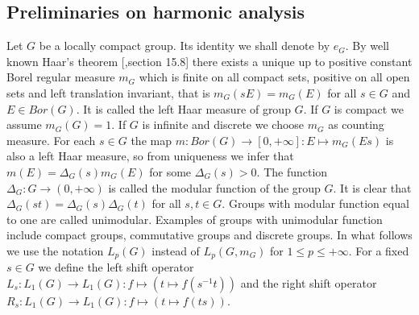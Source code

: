
\subsection{
    Preliminaries on harmonic analysis
}\label{SectionPreliminariesOnHarmonicAnalysis} 

Let $G$ be a locally compact group. Its identity we shall denote by $e_G$. By
well known Haar's theorem [\cite{HewRossAbstrHarmAnalVol1},section 15.8] there
exists a unique up to positive constant Borel regular measure $m_G$ which is
finite on all compact sets, positive on all open sets and left translation
invariant, that is $m_G(sE)=m_G(E)$ for all $s\in G$ and $E\in Bor(G)$. It is
called the left Haar measure of group $G$. If $G$ is compact we assume
$m_G(G)=1$. If $G$ is infinite and discrete we choose $m_G$ as counting measure.
For each $s\in G$ the map $m:Bor(G)\to[0,+\infty]:E\mapsto m_G(Es)$ is also a
left Haar measure, so from uniqueness we infer that $m(E)=\Delta_G(s)m_G(E)$ for
some $\Delta_G(s)>0$. The function $\Delta_G:G\to(0,+\infty)$ is called the
modular function of the group $G$. It is clear that
$\Delta_G(st)=\Delta_G(s)\Delta_G(t)$ for all $s,t\in G$. Groups with modular
function equal to one are called unimodular. Examples of groups with unimodular
function include compact groups, commutative groups and discrete groups. In what
follows we use the notation $L_p(G)$ instead of $L_p(G,m_G)$ 
for $1\leq p\leq+\infty$. For a fixed $s\in G$ we define the left shift operator
$L_s:L_1(G)\to L_1(G):f\mapsto(t\mapsto f(s^{-1}t))$ and the right shift
operator $R_s:L_1(G)\to L_1(G):f\mapsto (t\mapsto f(ts))$. 

